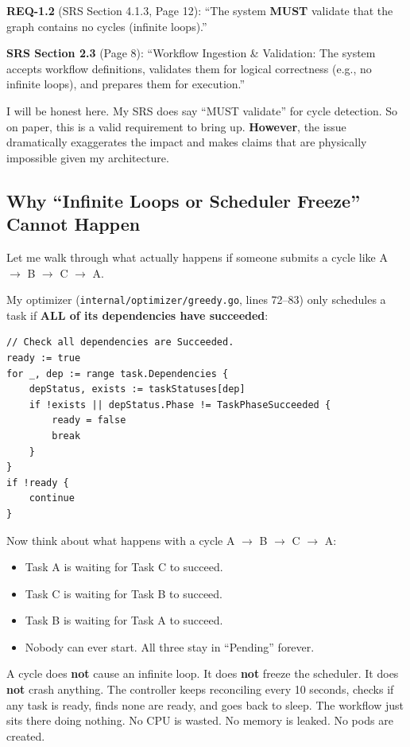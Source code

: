 \documentclass[12pt,a4paper]{article}
\begin{document}
\begin{srsbox}
\textbf{REQ-1.2} (SRS Section 4.1.3, Page 12): ``The system \textbf{MUST} validate that the graph contains no cycles (infinite loops).''

\textbf{SRS Section 2.3} (Page 8): ``Workflow Ingestion \& Validation: The system accepts workflow definitions, validates them for logical correctness (e.g., no infinite loops), and prepares them for execution.''
\end{srsbox}

I will be honest here. My SRS does say ``MUST validate'' for cycle detection. So on paper, this is a valid requirement to bring up. \textbf{However}, the issue dramatically exaggerates the impact and makes claims that are physically impossible given my architecture.

\subsection{Why ``Infinite Loops or Scheduler Freeze'' Cannot Happen}

Let me walk through what actually happens if someone submits a cycle like A $\to$ B $\to$ C $\to$ A.

My optimizer (\texttt{internal/optimizer/greedy.go}, lines 72--83) only schedules a task if \textbf{ALL of its dependencies have succeeded}:

\begin{lstlisting}
// Check all dependencies are Succeeded.
ready := true
for _, dep := range task.Dependencies {
    depStatus, exists := taskStatuses[dep]
    if !exists || depStatus.Phase != TaskPhaseSucceeded {
        ready = false
        break
    }
}
if !ready {
    continue
}
\end{lstlisting}

Now think about what happens with a cycle A $\to$ B $\to$ C $\to$ A:
\begin{itemize}
  \item Task A is waiting for Task C to succeed.
  \item Task C is waiting for Task B to succeed.
  \item Task B is waiting for Task A to succeed.
  \item Nobody can ever start. All three stay in ``Pending'' forever.
\end{itemize}

\begin{factbox}
A cycle does \textbf{not} cause an infinite loop. It does \textbf{not} freeze the scheduler. It does \textbf{not} crash anything. The controller keeps reconciling every 10 seconds, checks if any task is ready, finds none are ready, and goes back to sleep. The workflow just sits there doing nothing. No CPU is wasted. No memory is leaked. No pods are created.
\end{factbox}
\end{document}
